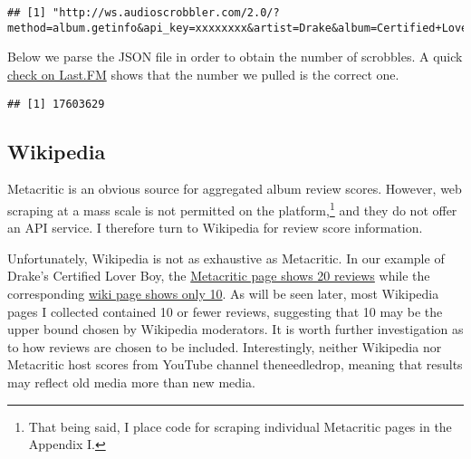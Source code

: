 \documentclass[
  11pt,
]{article}
\newenvironment{Shaded}{\begin{snugshade}}{\end{snugshade}}
\newcommand{\FunctionTok}[1]{\textcolor[rgb]{0.00,0.00,0.00}{#1}}
\newcommand{\NormalTok}[1]{#1}
\newcommand{\OtherTok}[1]{\textcolor[rgb]{0.56,0.35,0.01}{#1}}
\newcommand{\SpecialCharTok}[1]{\textcolor[rgb]{0.00,0.00,0.00}{#1}}
\begin{document}
\begin{verbatim}
## [1] "http://ws.audioscrobbler.com/2.0/?method=album.getinfo&api_key=xxxxxxxx&artist=Drake&album=Certified+Lover+Boy&format=json"
\end{verbatim}

Below we parse the JSON file in order to obtain the number of scrobbles.
A quick \href{https://www.last.fm/music/Drake/Certified+Lover+Boy}{check
on Last.FM} shows that the number we pulled is the correct one.

\begin{Shaded}
\end{Shaded}

\begin{verbatim}
## [1] 17603629
\end{verbatim}

\hypertarget{wikipedia}{%
\subsection{Wikipedia}\label{wikipedia}}

Metacritic is an obvious source for aggregated album review scores.
However, web scraping at a mass scale is not permitted on the
platform,\footnote{That being said, I place code for scraping individual
  Metacritic pages in the Appendix I.} and they do not offer an API
service. I therefore turn to Wikipedia for review score information.

Unfortunately, Wikipedia is not as exhaustive as Metacritic. In our
example of Drake's Certified Lover Boy, the
\href{https://www.metacritic.com/music/certified-lover-boy/drake}{Metacritic
page shows 20 reviews} while the corresponding
\href{https://en.wikipedia.org/wiki/Certified_Lover_Boy}{wiki page shows
only 10}. As will be seen later, most Wikipedia pages I collected
contained 10 or fewer reviews, suggesting that 10 may be the upper bound
chosen by Wikipedia moderators. It is worth further investigation as to
how reviews are chosen to be included. Interestingly, neither Wikipedia
nor Metacritic host scores from YouTube channel theneedledrop, meaning
that results may reflect old media more than new media.
\end{document}
